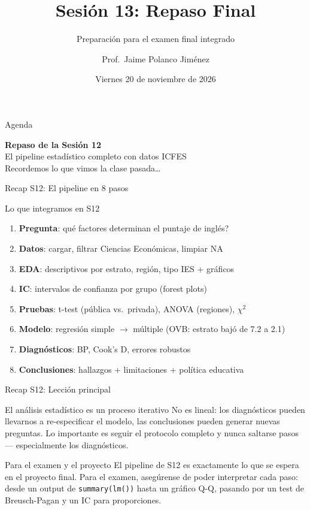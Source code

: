 \documentclass[aspectratio=169, 11pt]{beamer}
\title{Sesión 13: Repaso Final}
\subtitle{Preparación para el examen final integrado}
\author{Prof.\ Jaime Polanco Jim\'enez}
\date{Viernes 20 de noviembre de 2026}
\begin{document}
\begin{frame}
\titlepage
\end{frame}

\begin{frame}{Agenda}
\tableofcontents
\end{frame}

\begin{frame}{}
\vfill
\centering
{\Large\textbf{Repaso de la Sesi\'on 12}}\\[1em]
{\normalsize El pipeline estad\'istico completo con datos ICFES}\\[0.5em]
{\small Recordemos lo que vimos la clase pasada\ldots}
\vfill
\end{frame}

\begin{frame}{Recap S12: El pipeline en 8 pasos}
\begin{exampleblock}{Lo que integramos en S12}
\small
\begin{enumerate}\setlength{\itemsep}{1pt}
  \item \textbf{Pregunta}: \textquestiondown{}qu\'e factores determinan el puntaje de ingl\'es?
  \item \textbf{Datos}: cargar, filtrar Ciencias Econ\'omicas, limpiar NA
  \item \textbf{EDA}: descriptivos por estrato, regi\'on, tipo IES + gr\'aficos
  \item \textbf{IC}: intervalos de confianza por grupo (forest plots)
  \item \textbf{Pruebas}: t-test (p\'ublica vs.\ privada), ANOVA (regiones), $\chi^2$
  \item \textbf{Modelo}: regresi\'on simple $\to$ m\'ultiple (OVB: estrato baj\'o de 7.2 a 2.1)
  \item \textbf{Diagn\'osticos}: BP, Cook's D, errores robustos
  \item \textbf{Conclusiones}: hallazgos + limitaciones + pol\'itica educativa
\end{enumerate}
\end{exampleblock}
\end{frame}

\begin{frame}{Recap S12: Lecci\'on principal}
\begin{alertblock}{El an\'alisis estad\'istico es un proceso iterativo}
\small
No es lineal: los diagn\'osticos pueden llevarnos a re-especificar el modelo, las conclusiones pueden generar nuevas preguntas. Lo importante es seguir el protocolo completo y nunca saltarse pasos --- especialmente los diagn\'osticos.
\end{alertblock}

\begin{block}{Para el examen y el proyecto}
\small
El pipeline de S12 es exactamente lo que se espera en el proyecto final. Para el examen, aseg\'urense de poder interpretar cada paso: desde un output de \texttt{summary(lm())} hasta un gr\'afico Q-Q, pasando por un test de Breusch-Pagan y un IC para proporciones.
\end{block}
\end{frame}
\end{document}
